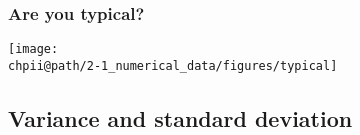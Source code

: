 \documentclass[slidestop,compress,mathserif]{beamer}
\makeatletter
\def\chpii@path{../../Chp 2}
\makeatother
\begin{document}






\begin{frame}
\frametitle{Are you typical?}

\begin{center}
\texttt{[image: \\chpii@path/2-1\_numerical\_data/figures/typical]}
\end{center}

\begin{center}
\footnotesize{}
\end{center}

\pause


\end{frame}


\subsection{Variance and standard deviation}

\end{document}
